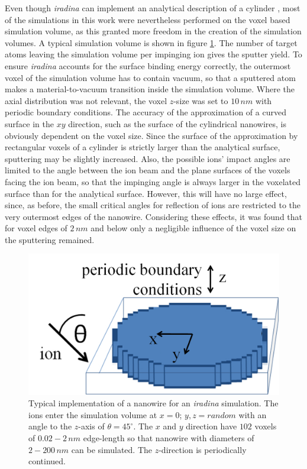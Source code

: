 Even though \emph{iradina} can implement an analytical description of a cylinder \cite{borschel_ion-solid_2012}, most of the simulations in this work were nevertheless performed on the voxel based simulation volume, as this granted more freedom in the creation of the simulation volumes. A typical simulation volume is shown in figure \ref{voxel}. The number of target atoms leaving the simulation volume per impinging ion gives the sputter yield. To ensure \emph{iradina} accounts for the surface binding energy correctly, the outermost voxel of the simulation volume has to contain vacuum, so that a sputtered atom makes a material-to-vacuum transition inside the simulation volume. Where the axial distribution was not relevant, the voxel $z$-size was set to $10\,nm$ with periodic boundary conditions. The accuracy of the approximation of a curved surface in the $xy$ direction, such as the surface of the cylindrical nanowires, is obviously dependent on the voxel size. Since the surface of the approximation by rectangular voxels of a cylinder is strictly larger than the analytical surface, sputtering may be slightly increased. Also, the possible ions' impact angles are limited to the angle between the ion beam and the plane surfaces of the voxels facing the ion beam, so that the impinging angle is always larger in the voxelated surface than for the analytical surface. However, this will have no large effect, since, as before, the small critical angles for reflection of ions are restricted to the very outermost edges of the nanowire. Considering these effects, it was found that for voxel edges of $2\,nm$ and below only a negligible influence of the voxel size on the sputtering remained. 

\begin{figure}
	\centering
		\includegraphics[width=.5\textwidth]{images/voxel.jpg}
	\caption{Typical implementation of a nanowire for an \emph{iradina} simulation. The ions enter the simulation volume at $x=0$; $y,z=random$ with an angle to the $z$-axis of $\theta = 45^\circ$. The $x$ and $y$ direction have $102$ voxels of $0.02-2\,nm$ edge-length so that nanowire with diameters of $2-200\,nm$ can be simulated. The $z$-direction is periodically continued.}
	\label{voxel}
\end{figure} 

